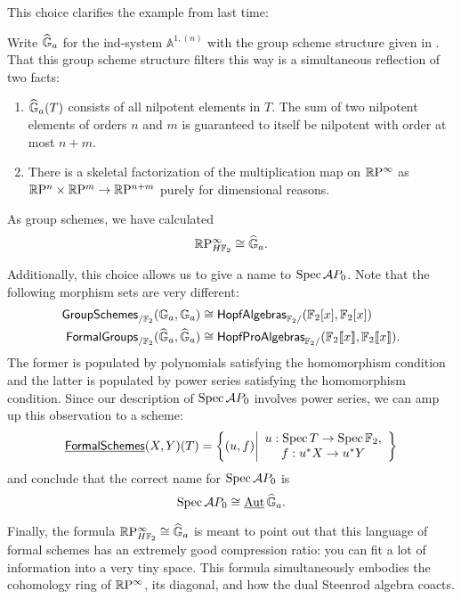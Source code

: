 This choice clarifies the example from last time:
\begin{example}\label{RPinftyExampleForReal}
Write $\widehat{\mathbb G}_a$ for the ind-system $\mathbb A^{1, (n)}$ with the group scheme structure given in .  That this group scheme structure filters this way is a simultaneous reflection of two facts:
\begin{enumerate}
\item $\widehat{\mathbb G}_a(T)$ consists of all nilpotent elements in $T$.  The sum of two nilpotent elements of orders $n$ and $m$ is guaranteed to itself be nilpotent with order at most $n+m$.
\item There is a skeletal factorization of the multiplication map on $\mathbb R\mathrm P^\infty$ as $\mathbb R\mathrm P^n \times \mathbb R\mathrm P^m \to \mathbb R\mathrm P^{n+m}$ purely for dimensional reasons.
\end{enumerate}
As group schemes, we have calculated \[\mathbb R\mathrm P^\infty_{H\mathbb F_2} \cong \widehat{\mathbb G}_a.\]
\end{example}

Additionally, this choice allows us to give a name to $\operatorname{Spec} \mathcal AP_0$.  Note that the following morphism sets are very different:
\begin{align*}
\mathsf{GroupSchemes}_{/\mathbb F_2}(\mathbb G_a, \mathbb G_a) & \cong \mathsf{HopfAlgebras}_{\mathbb F_2/}(\mathbb F_2[x], \mathbb F_2[x]) \\
\mathsf{FormalGroups}_{/\mathbb F_2}(\widehat{\mathbb G}_a, \widehat{\mathbb G}_a) & \cong \mathsf{HopfProAlgebras}_{\mathbb F_2/}(\mathbb F_2\llbracket x \rrbracket, \mathbb F_2\llbracket x \rrbracket).
\end{align*}
The former is populated by polynomials satisfying the homomorphism condition and the latter is populated by power series satisfying the homomorphism condition.  Since our description of $\operatorname{Spec} \mathcal AP_0$ involves power series, we can amp up this observation to a scheme: \[\operatorname{\underline{\smash{\mathsf{FormalSchemes}}}}(X, Y)(T) = \left\{ (u, f) \middle| \begin{array}{c} u: \operatorname{Spec} T \to \operatorname{Spec} \mathbb F_2, \\ f: u^* X \to u^* Y \end{array}\right\}\] and conclude that the correct name for $\operatorname{Spec} \mathcal AP_0$ is \[\operatorname{Spec} \mathcal AP_0 \cong \operatorname{\underline{\smash{\operatorname{Aut}}}} \widehat{\mathbb G}_a.\]

Finally, the formula $\mathbb R\mathrm P^\infty_{H\mathbb F_2} \cong \widehat{\mathbb G}_a$ is meant to point out that this language of formal schemes has an extremely good compression ratio: you can fit a lot of information into a very tiny space.  This formula simultaneously embodies the cohomology ring of $\mathbb R\mathrm P^\infty$, its diagonal, and how the dual Steenrod algebra coacts.

